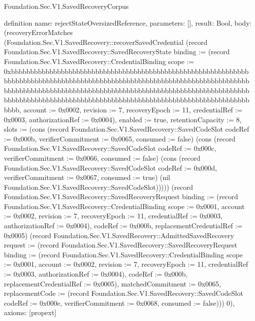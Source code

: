 \begin{lexlean}{Foundation.Sec.V1.SavedRecoveryCorpus}
\begin{semanticmodule}
definition{
  name: rejectStateOversizedReference,
  parameters: [],
  result: Bool,
  body: (recoveryErrorMatches (Foundation.Sec.V1.SavedRecovery::recoverSavedCredential (record Foundation.Sec.V1.SavedRecovery::SavedRecoveryState {binding := (record Foundation.Sec.V1.SavedRecovery::CredentialBinding {scope := 0xbbbbbbbbbbbbbbbbbbbbbbbbbbbbbbbbbbbbbbbbbbbbbbbbbbbbbbbbbbbbbbbbbbbbbbbbbbbbbbbbbbbbbbbbbbbbbbbbbbbbbbbbbbbbbbbbbbbbbbbbbbbbbbbbbbbbbbbbbbbbbbbbbbbbbbbbbbbbbbbbbbbbbbbbbbbbbbbbbbbbbbbbbbbbbbbbbbbbbbbbbbbbbbbbbbbbbbbbbbbbbbbbbbbbbbbbbbbbbbbbbbbbbbbbbbbbbbbbbb, account := 0x0002, revision := 7, recoveryEpoch := 11, credentialRef := 0x0003, authorizationRef := 0x0004}), enabled := true, retentionCapacity := 8, slots := (cons (record Foundation.Sec.V1.SavedRecovery::SavedCodeSlot {codeRef := 0x000b, verifierCommitment := 0x0065, consumed := false}) (cons (record Foundation.Sec.V1.SavedRecovery::SavedCodeSlot {codeRef := 0x000c, verifierCommitment := 0x0066, consumed := false}) (cons (record Foundation.Sec.V1.SavedRecovery::SavedCodeSlot {codeRef := 0x000d, verifierCommitment := 0x0067, consumed := true}) (nil Foundation.Sec.V1.SavedRecovery::SavedCodeSlot))))}) (record Foundation.Sec.V1.SavedRecovery::SavedRecoveryRequest {binding := (record Foundation.Sec.V1.SavedRecovery::CredentialBinding {scope := 0x0001, account := 0x0002, revision := 7, recoveryEpoch := 11, credentialRef := 0x0003, authorizationRef := 0x0004}), codeRef := 0x000b, replacementCredentialRef := 0x0005}) (record Foundation.Sec.V1.SavedRecovery::AdmittedSavedRecovery {request := (record Foundation.Sec.V1.SavedRecovery::SavedRecoveryRequest {binding := (record Foundation.Sec.V1.SavedRecovery::CredentialBinding {scope := 0x0001, account := 0x0002, revision := 7, recoveryEpoch := 11, credentialRef := 0x0003, authorizationRef := 0x0004}), codeRef := 0x000b, replacementCredentialRef := 0x0005}), matchedCommitment := 0x0065, replacementCode := (record Foundation.Sec.V1.SavedRecovery::SavedCodeSlot {codeRef := 0x000e, verifierCommitment := 0x0068, consumed := false})})) 0),
  axioms: [propext]
}


\end{semanticmodule}
\end{lexlean}
